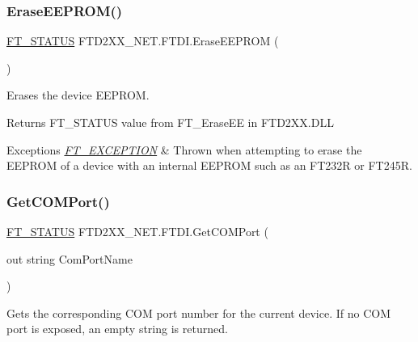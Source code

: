 \subsubsection{\texorpdfstring{EraseEEPROM()}{EraseEEPROM()}}
{\footnotesize\ttfamily \mbox{\hyperlink{class_f_t_d2_x_x___n_e_t_1_1_f_t_d_i_aabe20ad905cc4ccc1e35dd5b877d9a83}{F\+T\+\_\+\+S\+T\+A\+T\+US}} F\+T\+D2\+X\+X\+\_\+\+N\+E\+T.\+F\+T\+D\+I.\+Erase\+E\+E\+P\+R\+OM (\begin{DoxyParamCaption}{ }\end{DoxyParamCaption})}



Erases the device E\+E\+P\+R\+OM. 

\begin{DoxyReturn}{Returns}
F\+T\+\_\+\+S\+T\+A\+T\+US value from F\+T\+\_\+\+Erase\+EE in F\+T\+D2\+X\+X.\+D\+LL
\end{DoxyReturn}

\begin{DoxyExceptions}{Exceptions}
{\em \mbox{\hyperlink{class_f_t_d2_x_x___n_e_t_1_1_f_t_d_i_1_1_f_t___e_x_c_e_p_t_i_o_n}{F\+T\+\_\+\+E\+X\+C\+E\+P\+T\+I\+ON}}} & Thrown when attempting to erase the E\+E\+P\+R\+OM of a device with an internal E\+E\+P\+R\+OM such as an F\+T232R or F\+T245R.\\
\hline
\end{DoxyExceptions}
\mbox{\label{class_f_t_d2_x_x___n_e_t_1_1_f_t_d_i_a48b2bcf58e56f1008ce86e526753d982}} 
\subsubsection{\texorpdfstring{GetCOMPort()}{GetCOMPort()}}
{\footnotesize\ttfamily \mbox{\hyperlink{class_f_t_d2_x_x___n_e_t_1_1_f_t_d_i_aabe20ad905cc4ccc1e35dd5b877d9a83}{F\+T\+\_\+\+S\+T\+A\+T\+US}} F\+T\+D2\+X\+X\+\_\+\+N\+E\+T.\+F\+T\+D\+I.\+Get\+C\+O\+M\+Port (\begin{DoxyParamCaption}\item[{out string}]{Com\+Port\+Name }\end{DoxyParamCaption})}



Gets the corresponding C\+OM port number for the current device. If no C\+OM port is exposed, an empty string is returned. 

